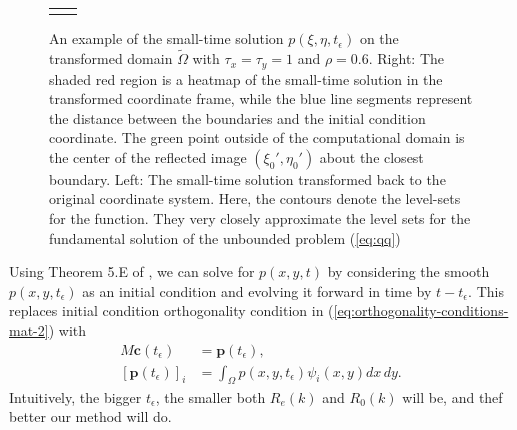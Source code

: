 \documentclass[10pt]{article}
\begin{document}
\begin{figure}
\begin{tabular}{cc}
\begin{minipage}{0.5\textwidth}
    \end{minipage}
  \end{tabular}
  \caption{An example of the small-time solution
    $p(\xi,\eta,t_\epsilon)$ on the transformed domain
    $\tilde{\Omega}$ with $\tau_x = \tau_y = 1$ and $\rho=0.6$. Right:
    The shaded red region is a heatmap of the small-time solution in
    the transformed coordinate frame, while the blue line segments
    represent the distance between the boundaries and the initial
    condition coordinate. The green point outside of the computational
    domain is the center of the reflected image $(\xi_0', \eta_0')$
    about the closest boundary. Left: The small-time solution
    transformed back to the original coordinate system. Here, the
    contours denote the level-sets for the function. They very closely
    approximate the level sets for the fundamental solution of the
    unbounded problem (\ref{eq:qq})}
  \label{fig:step-1-small-time}
\end{figure}
Using Theorem 5.E of \cite{zeidler1995applied}, we can solve for
$p(x,y,t)$ by considering the smooth $p(x,y,t_\epsilon)$ as an initial
condition and evolving it forward in time by $t-t_\epsilon$. This
replaces initial condition orthogonality condition in
(\ref{eq:orthogonality-conditions-mat-2}) with
\begin{align}
  M \mathbf{c}(t_\epsilon) &= \mathbf{p}(t_\epsilon), \\
   [\mathbf{p}(t_\epsilon)]_i &= \displaystyle \int_\Omega p(x,y,t_\epsilon) \psi_i(x,y) dx\,dy. \nonumber
\end{align}
Intuitively, the bigger $t_\epsilon$, the smaller both $R_e(k)$ and
$R_0(k)$ will be, and thef better our method will do.
\end{document}
